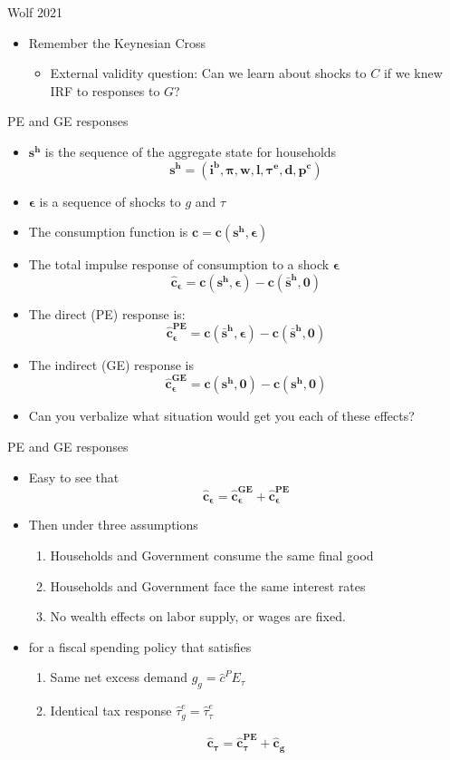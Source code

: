 \documentclass[english,xcolor=svgnames]{beamer}
\begin{document}
\begin{frame}{Wolf 2021}
\begin{itemize}
\item Remember the Keynesian Cross
\begin{itemize}
\item External validity question: Can we learn about shocks to $C$ if we knew IRF to responses to $G$?
\end{itemize}
\end{itemize}
\end{frame}


\begin{frame}{PE and GE responses}
\begin{itemize}
\item $\mathbf{s^h}$ is the sequence of the aggregate state for households $$\mathbf{s^h} = (\mathbf{i^b,\pi,w,l,\tau^e,d,p^c})$$
\item $\mathbf{\epsilon}$ is a sequence of shocks to $g$ and $\tau$
\item The consumption function is $\mathbf{c} = \mathbf{c(s^h,\epsilon)}$
\item The total impulse response of consumption to a shock $\mathbf{\epsilon}$
$$\mathbf{\hat{c}_{\epsilon} = c(s^h,\epsilon) - c(\bar{s}^h,0)}$$
\item The direct (PE) response is:
$$\mathbf{\hat{c}^{PE}_{\epsilon} = c(\bar{s}^h,\epsilon) - c(\bar{s}^h,0)}$$
\item The indirect (GE) response is
$$\mathbf{\hat{c}^{GE}_{\epsilon} = c(s^h,0) - c(s^h,0)}$$
\item Can you verbalize what situation would get you each of these effects?
\end{itemize}
\end{frame}

\begin{frame}{PE and GE responses}
\begin{itemize}
\item Easy to see that
$$\mathbf{\hat{c}_{\epsilon} = \hat{c}^{GE}_{\epsilon}  + \hat{c}^{PE}_{\epsilon}} $$
\item Then under three assumptions
\begin{enumerate}
\item Households and Government consume the same final good
\item Households and Government face the same interest rates
\item No wealth effects on labor supply, or wages are fixed.
\end{enumerate}
\item for a fiscal spending policy that satisfies
\begin{enumerate}
\item Same net excess demand $\hat{g}_g =\hat{c}^PE_{\tau}$
\item Identical tax response $\hat{\tau}^e_g = \hat{\tau}^e_{\tau}$
\end{enumerate}
$$\mathbf{\hat{c}_{\tau} = \hat{c}^{PE}_{\tau}  + \hat{c}_g} $$
\end{itemize}
\end{frame}
\end{document}
